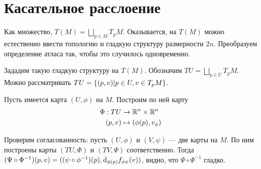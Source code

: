 \documentclass[a4paper]{report}
\begin{document}
    \section{Касательное расслоение}
    Как множество, $T(M) = \bigsqcup\limits_{p \in M}T_p M$.
    Оказывается, на $T(M)$ можно естественно ввести топологию и гладкую структуру размерности $2n$.
    Преобразуем определение атласа так, чтобы это случилось одновременно.

    Зададим такую гладкую структуру на $T(M)$.
    Обозначим $T U = \bigsqcup\limits_{p \in U}T_p M$.
    Можно рассматривать $TU = \left\{(p, v)\middle|p \in U, v \in T_p M\right\}$.

    Пусть имеется карта $(U, \phi)$ на $M$.
    Построим по ней карту \begin{align*}\Phi: TU &\rightarrow \mathbb{R}^n \times \mathbb{R}^n \\ (p, v) & \mapsto (\phi(p), v_\phi)\end{align*}

    Проверим согласованность: пусть $(U, \phi)$ и $(V, \psi)$ --- две карты на $M$.
    По ним построены карты $(TU, \Phi)$ и $(TV, \Psi)$ соответственно.
    Тогда $(\Psi \circ \Phi^{-1})(p, v) = ((\psi \circ \phi^{-1})(p), \operatorname{d}\!_{\phi(p)}{f_{\phi\psi}}(v))$, видно, что $\Psi \circ \Phi^{-1}$ гладко.
\end{document}
